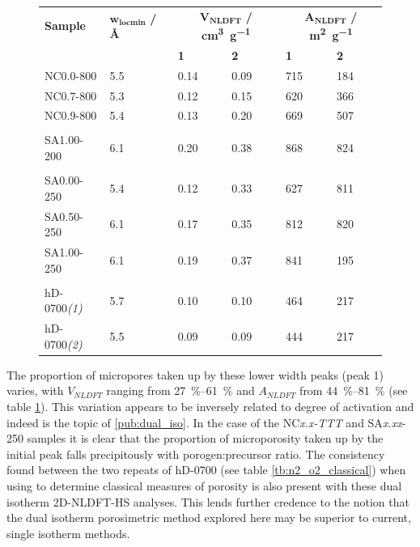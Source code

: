 \begin{figure}[hptb]
    \begin{tabularx}{\textwidth}{llXXXX}
    \toprule
        \textbf{Sample} & $\mathbf{w_{locmin}}$ \textbf{/ \unit[detect-weight]{\angstrom}} & \multicolumn{2}{c}{$\mathbf{V_{NLDFT}}$ \textbf{/ \unit[detect-weight]{\cm\cubed\per\gram}}} & \multicolumn{2}{c}{$\mathbf{A_{NLDFT}}$ \textbf{/ \unit[detect-weight]{\metre\squared\per\gram}}} \\
        & & \textbf{1} & \textbf{2} & \textbf{1} & \textbf{2} \\
    \midrule
        NC0.0-800 & 5.5 & 0.14 & 0.09 & 715 & 184 \\
        NC0.7-800 & 5.3 & 0.12 & 0.15 & 620 & 366 \\
        NC0.9-800 & 5.4 & 0.13 & 0.20 & 669 & 507 \\
        \\
        SA1.00-200 & 6.1 & 0.20 & 0.38 & 868 & 824 \\
        \\
        SA0.00-250 & 5.4 & 0.12 & 0.33 & 627 & 811 \\
        SA0.50-250 & 6.1 & 0.17 & 0.35 & 812 & 820 \\
        SA1.00-250 & 6.1 & 0.19 & 0.37 & 841 & 195 \\
        \\
        hD-0700\textit{(1)} & 5.7 & 0.10 & 0.10 & 464 & 217 \\
        hD-0700\textit{(2)} & 5.5 & 0.09 & 0.09 & 444 & 217 \\
    \bottomrule
    \end{tabularx}
    \label{tb:finepore}
\end{figure}

The proportion of \glspl{micropore} taken up by these lower width peaks (peak 1) varies, with $V_{NLDFT}$ ranging from \qtyrange[list-units=single]{27}{61}{\percent} and $A_{NLDFT}$ from \qtyrange[list-units=single]{44}{81}{\percent} (see table \ref{tb:finepore}). This variation appears to be inversely related to degree of activation and indeed is the topic of \ref{pub:dual_iso}. In the case of the NC\textit{x.x-TTT} and SA\textit{x.xx}-250 samples it is clear that the proportion of microporosity taken up by the initial peak falls precipitously with \gls{porogen}:precursor ratio. The consistency found between the two repeats of hD-0700 (see table \ref{tb:n2_o2_classical}) when using  to determine classical measures of porosity is also present with these dual isotherm 2D-NLDFT-HS analyses. This lends further credence to the notion that the dual isotherm porosimetric method explored here may be superior to current, single isotherm methods.

